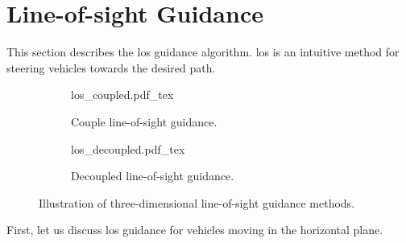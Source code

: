 \section{Line-of-sight Guidance}
\label{sec:background_LOS}

This section describes the \gls{los} guidance algorithm.
\gls{los} is an intuitive method for steering vehicles towards the desired path.

\begin{figure}[t]
    \centering
    \begin{subfigure}{0.32\textwidth}
        \def\svgwidth{\textwidth}
        {los_coupled.pdf_tex}
        \caption{Couple line-of-sight guidance.}
    \end{subfigure}
    \begin{subfigure}{0.66\textwidth}
        \def\svgwidth{\textwidth}
        {los_decoupled.pdf_tex}
        \caption{Decoupled line-of-sight guidance.}
    \end{subfigure}
    \caption{Illustration of three-dimensional line-of-sight guidance methods.}
\end{figure}

First, let us discuss \gls{los} guidance for vehicles moving in the horizontal plane.

